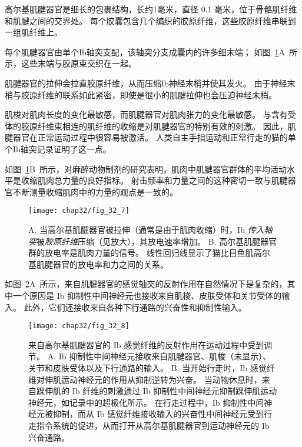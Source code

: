 \begin{proposition}[神经解剖学导航术语] \label{box:32_4}
	
	\quad \quad 高尔基肌腱器官是细长的包裹结构，长约1毫米，直径 0.1 毫米，位于骨骼肌纤维和肌腱之间的交界处。
	每个胶囊包含几个编织的胶原纤维，这些胶原纤维串联到一组肌纤维上。
	
	\quad \quad 每个肌腱器官由单个Ib轴突支配，该轴突分支成囊内的许多细末端；
	如图~\ref{fig:32_7}A~所示，这些末端与胶原束交织在一起。
	
	\quad \quad 肌腱器官的拉伸会拉直胶原纤维，从而压缩Ib神经末梢并使其发火。
	由于神经末梢与胶原纤维的联系如此紧密，即使是很小的肌腱拉伸也会压迫神经末梢。
	
	\quad \quad 肌梭对肌肉长度的变化最敏感，而肌腱器官对肌肉张力的变化最敏感。
	与含有受体的胶原纤维束相连的肌纤维的收缩是对肌腱器官的特别有效的刺激。
	因此，肌腱器官在正常运动过程中很容易被激活。
	人类自主手指运动和正常行走的猫的单个Ib轴突记录证明了这一点。
	
	\quad \quad 如图~\ref{fig:32_7}B~所示，对麻醉动物制剂的研究表明，肌肉中肌腱器官群体的平均活动水平是收缩肌肉总力量的良好指标。
	射击频率和力量之间的这种密切一致与肌腱器官不断测量收缩肌肉中的力量的观点是一致的。
	
\end{proposition}


\begin{figure}[htbp]
	\centering
	\texttt{[image: chap32/fig\_32\_7]}
	\caption{A. 当高尔基肌腱器官被拉伸（通常是由于肌肉收缩）时，Ib \textit{传入轴突}被\textit{胶原纤维}压缩（见放大），其放电速率增加\cite{biederman2013human}。
	B. 高尔基肌腱器官群的放电率是肌肉力量的信号。
	线性回归线显示了猫比目鱼肌高尔基肌腱器官的放电率和力之间的关系\cite{crago1982sampling}。}
	\label{fig:32_7}
\end{figure}


如图~\ref{fig:32_8}A~所示，来自肌腱器官的感觉轴突的反射作用在自然情况下是复杂的，其中一个原因是 Ib 抑制性中间神经元也接收来自肌梭、皮肤受体和关节受体的输入。
此外，它们还接收来自各种下行通路的兴奋性和抑制性输入。


\begin{figure}[htbp]
	\centering
	\texttt{[image: chap32/fig\_32\_8]}
	\caption{来自高尔基肌腱器官的 Ib 感觉纤维的反射作用在运动过程中受到调节。
	A. Ib 抑制性中间神经元接收来自肌腱器官、肌梭（未显示）、关节和皮肤受体以及下行通路的输入。
	B. 当开始行走时，Ib 感觉纤维对伸肌运动神经元的作用从抑制逆转为兴奋。
	当动物休息时，来自踝伸肌的 Ib 纤维的刺激通过 Ib 抑制性中间神经元抑制踝伸肌运动神经元，如记录中的超极化所示。
	在行走过程中，Ib 抑制性中间神经元被抑制，而从 Ib 感觉纤维接收输入的兴奋性中间神经元受到行走指令系统的促进，从而打开从高尔基肌腱器官到运动神经元的 Ib 兴奋通路。}
	\label{fig:32_8}
\end{figure}


